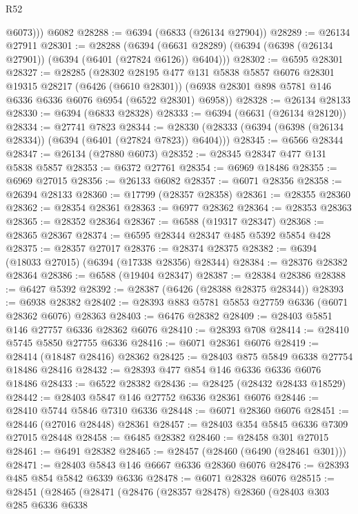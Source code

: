 \begin{lexlean}{R52}
\begin{coremodule}
          @6073)))
    @6082
@28288 := @6394 (@6833 (@26134 @27904))
@28289 := @26134 @27911
@28301 := @28288
    (@6394 (@6631 @28289) (@6394 (@6398 (@26134 @27901)) (@6394 (@6401 (@27824 @6126)) @6404)))
@28302 := @6595 @28301
@28327 := @28285
    (@28302
      @28195
      @477
      @131
      @5838
      @5857
      @6076
      @28301
      @19315
      @28217
      (@6426 (@6610 @28301))
      (@6938 @28301 @898 @5781 @146 @6336 @6336 @6076 @6954 (@6522 @28301) @6958))
@28328 := @26134 @28133
@28330 := @6394 (@6833 @28328)
@28333 := @6394 (@6631 (@26134 @28120))
@28334 := @27741 @7823
@28344 := @28330 (@28333 (@6394 (@6398 (@26134 @28334)) (@6394 (@6401 (@27824 @7823)) @6404)))
@28345 := @6566 @28344
@28347 := @26134 (@27880 @6073)
@28352 := @28345 @28347 @477 @131 @5838 @5857
@28353 := @6372 @27761
@28354 := @6969 @18486
@28355 := @6969 @27015
@28356 := @26133 @6082
@28357 := @6071 @28356
@28358 := @26394 @28133
@28360 := @17799 (@28357 @28358)
@28361 := @28355 @28360
@28362 := @28354 @28361
@28363 := @6977 @28362
@28364 := @28353 @28363
@28365 := @28352 @28364
@28367 := @6588 (@19317 @28347)
@28368 := @28365 @28367
@28374 := @6595 @28344 @28347 @485 @5392 @5854 @428
@28375 := @28357 @27017
@28376 := @28374 @28375
@28382 := @6394 (@18033 @27015) (@6394 (@17338 @28356) @28344)
@28384 := @28376 @28382 @28364
@28386 := @6588 (@19404 @28347)
@28387 := @28384 @28386
@28388 := @6427 @5392
@28392 := @28387 (@6426 (@28388 @28375 @28344))
@28393 := @6938 @28382
@28402 := @28393 @883 @5781 @5853 @27759 @6336 (@6071 @28362 @6076) @28363
@28403 := @6476 @28382
@28409 := @28403 @5851 @146 @27757 @6336 @28362 @6076
@28410 := @28393 @708
@28414 := @28410 @5745 @5850 @27755 @6336
@28416 := @6071 @28361 @6076
@28419 := @28414 (@18487 @28416) @28362
@28425 := @28403 @875 @5849 @6338 @27754 @18486 @28416
@28432 := @28393 @477 @854 @146 @6336 @6336 @6076 @18486
@28433 := @6522 @28382
@28436 := @28425 (@28432 @28433 @18529)
@28442 := @28403 @5847 @146 @27752 @6336 @28361 @6076
@28446 := @28410 @5744 @5846 @7310 @6336
@28448 := @6071 @28360 @6076
@28451 := @28446 (@27016 @28448) @28361
@28457 := @28403 @354 @5845 @6336 @7309 @27015 @28448
@28458 := @6485 @28382
@28460 := @28458 @301 @27015
@28461 := @6491 @28382
@28465 := @28457 (@28460 (@6490 (@28461 @301)))
@28471 := @28403 @5843 @146 @6667 @6336 @28360 @6076
@28476 := @28393 @485 @854 @5842 @6339 @6336
@28478 := @6071 @28328 @6076
@28515 := @28451
    (@28465
      (@28471
        (@28476
          (@28357 @28478)
          @28360
          (@28403
            @303
            @285
            @6336
            @6338

\end{coremodule}
\end{lexlean}
